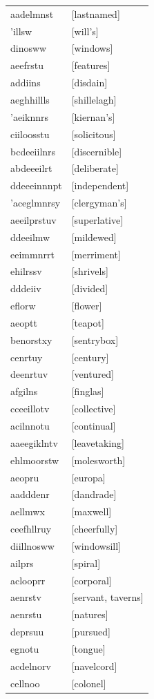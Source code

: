 \documentclass{article}
\begin{document}
\begin{tabular}{ll}
aadelmnst & [lastnamed] \\
'illsw & [will's] \\
dinosww & [windows] \\
aeefrstu & [features] \\
addiins & [disdain] \\
aeghhillls & [shillelagh] \\
'aeiknnrs & [kiernan's] \\
ciiloosstu & [solicitous] \\
bcdeeiilnrs & [discernible] \\
abdeeeilrt & [deliberate] \\
ddeeeinnnpt & [independent] \\
'aceglmnrsy & [clergyman's] \\
aeeilprstuv & [superlative] \\
ddeeilmw & [mildewed] \\
eeimmnrrt & [merriment] \\
ehilrssv & [shrivels] \\
dddeiiv & [divided] \\
eflorw & [flower] \\
aeoptt & [teapot] \\
benorstxy & [sentrybox] \\
cenrtuy & [century] \\
deenrtuv & [ventured] \\
afgilns & [finglas] \\
cceeillotv & [collective] \\
acilnnotu & [continual] \\
aaeegiklntv & [leavetaking] \\
ehlmoorstw & [molesworth] \\
aeopru & [europa] \\
aadddenr & [dandrade] \\
aellmwx & [maxwell] \\
ceefhllruy & [cheerfully] \\
diillnosww & [windowsill] \\
ailprs & [spiral] \\
aclooprr & [corporal] \\
aenrstv & [servant, taverns] \\
aenrstu & [natures] \\
deprsuu & [pursued] \\
egnotu & [tongue] \\
acdelnorv & [navelcord] \\
cellnoo & [colonel] \\

\end{tabular}
\end{document}
